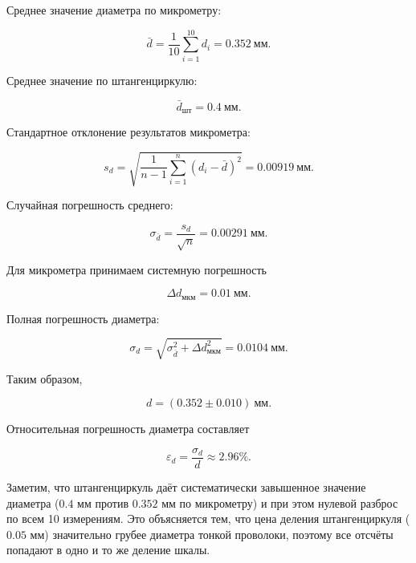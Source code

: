 \documentclass[12pt,a4paper]{article}
\begin{document}
Среднее значение диаметра по микрометру:

\begin{equation}
\bar d=
\frac{1}{10}\sum_{i=1}^{10}d_i
=
0.352\ \text{мм}.
\end{equation}

Среднее значение по штангенциркулю:

\begin{equation}
\bar d_{\text{шт}}
=
0.4\ \text{мм}.
\end{equation}

Стандартное отклонение результатов микрометра:

\begin{equation}
s_d=
\sqrt{
\frac{1}{n-1}
\sum_{i=1}^{n}(d_i-\bar d)^2
}
=
0.00919\ \text{мм}.
\end{equation}

Случайная погрешность среднего:

\begin{equation}
\sigma_{\bar d}
=
\frac{s_d}{\sqrt n}
=
0.00291\ \text{мм}.
\end{equation}

Для микрометра принимаем системную погрешность

\begin{equation}
\Delta d_{\text{мкм}}
=
0.01\ \text{мм}.
\end{equation}

Полная погрешность диаметра:

\begin{equation}
\sigma_d=
\sqrt{
\sigma_{\bar d}^2+
\Delta d_{\text{мкм}}^2
}
=
0.0104\ \text{мм}.
\end{equation}

Таким образом,

\begin{equation}
\boxed{
d=(0.352\pm0.010)\ \text{мм}
}.
\end{equation}

Относительная погрешность диаметра составляет

\begin{equation}
\varepsilon_d=
\frac{\sigma_d}{d}
\approx
2.96\%.
\end{equation}

Заметим, что штангенциркуль даёт систематически завышенное значение
диаметра ($0.4$ мм против $0.352$ мм по микрометру) и при этом нулевой
разброс по всем 10 измерениям. Это объясняется тем, что цена деления
штангенциркуля ($0.05$ мм) значительно грубее диаметра тонкой проволоки,
поэтому все отсчёты попадают в одно и то же деление шкалы.
\end{document}
